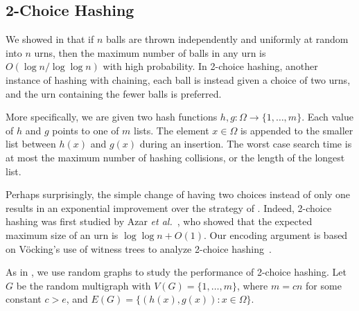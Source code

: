 

\subsection{2-Choice Hashing}

We showed in  that if $n$ balls are thrown
independently and uniformly at random into $n$ urns, then the maximum
number of balls in any urn is $O(\log n/\log \log n)$ with high
probability. In 2-choice hashing, another instance of hashing with
chaining, each ball is instead given a choice of two urns, and the urn
containing the fewer balls is preferred.

More specifically, we are given two hash functions $h, g : \Omega \to
\{1, \ldots, m\}$. Each value of $h$ and $g$ points to one of $m$
lists. The element $x \in \Omega$ is appended to the smaller list
between $h(x)$ and $g(x)$ during an insertion. The worst case search
time is at most the maximum number of hashing collisions, or the
length of the longest list.

Perhaps surprisingly, the simple change of having two choices instead
of only one results in an exponential improvement over the strategy of
. Indeed, 2-choice hashing was first studied by
Azar \emph{et al.}~\cite{azar:multiplechoice}, who showed that the
expected maximum size of an urn is $\log \log n + O(1)$. Our encoding
argument is based on V\"{o}cking's use of witness trees to analyze
2-choice hashing~\cite{vocking:witness}.

As in , we use random graphs to study the
performance of 2-choice hashing. Let $G$ be the random multigraph with
$V(G) = \{1, \ldots, m\}$, where $m = cn$ for some constant $c > e$,
and $E(G) = \{(h(x), g(x)) : x \in \Omega\}$.

